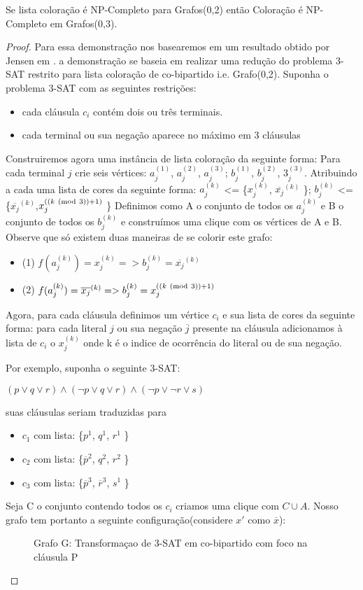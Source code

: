 \begin{corolario}
	Se lista coloração é NP-Completo para Grafos(0,2) então Coloração é NP-Completo em Grafos(0,3).
	\begin{proof}
		Para essa demonstração nos basearemos em um resultado obtido por Jensen em \cite{jansen1999}. a demonstração se baseia em realizar uma redução do problema 3-SAT restrito para lista coloração de co-bipartido i.e. Grafo(0,2).
		Suponha o problema 3-SAT com as seguintes restrições:
		\begin{itemize}
			\item cada cláusula $c_i$ contém dois ou três terminais.
			\item cada terminal ou sua negação aparece no máximo em 3 cláusulas
		\end{itemize}
		Construiremos agora uma instância de lista coloração da seguinte forma:\newline
		Para cada terminal $j$ crie seis vértices:
		$a_j^{(1)}$, $a_j^{(2)}$, $a_j^{(3)}$;
		$b_j^{(1)}$, $b_j^{(2)}$, $3_j^{(3)}$. Atribuindo a cada uma lista de cores da seguinte forma:\newline
		$a_j^{(k)}$ <= \{$x_j^{(k)}$, $\overline{x_j}^{(k)}$ \}; $b_j^{(k)}$ <= \{$\overline{x_j}^{(k)}$,$x_j^{((k \ (\mathrm{mod}\ 3)) + 1 )}$ \}\newline
		Definimos como A o conjunto de todos os $a_j^{(k)}$ e B o conjunto de todos os $b_j^{(k)}$ e construímos uma clique com os vértices de A e B. Observe que só existem duas maneiras de se colorir este grafo:
		\begin{itemize}
			\item (1)  $f(a_j^{(k)}) = x_j^{(k)} => b_j^{(k)} = \overline{x_j}^{(k)}$
			\item (2)  $f(a_j^{(k)}) = \overline{x_j}^{(k)} => b_j^{(k)} = x_j^{((k \ (\mathrm{mod}\ 3)) + 1 )}$
		\end{itemize}
		Agora, para cada cláusula definimos um vértice $c_i$ e sua lista de cores da seguinte forma: para cada literal $j$ ou sua negação $\overline{j}$ presente na cláusula adicionamos à lista de $c_i$ o $x_j^{(k)}$ onde k é o indice de ocorrência do literal ou de sua negação.
		
		Por exemplo, suponha o seguinte 3-SAT:
		
		$(p \lor q \lor r) \land (\neg{p} \lor q \lor r) \land (\neg{p} \lor \neg{r} \lor s)$
		
		suas cláusulas seriam traduzidas para
		\begin{itemize}
			\item $c_1$ com lista: \{$p^1$, $q^1$, $r^1$ \}
			\item $c_2$ com lista: \{$\overline{p}^2$, $q^2$, $r^2$ \}
			\item $c_3$ com lista: \{$\overline{p}^3$, $\overline{r}^3$, $s^1$ \}
		\end{itemize}
		Seja C o conjunto contendo todos os $c_i$ criamos uma clique com $C \cup A$.
		Nosso grafo tem portanto a seguinte configuração(considere $x'$ como $\overline{x}$):
		\begin{figure}[!ht]
			\centering
			
			\caption{Grafo G: Transformaçao de 3-SAT em co-bipartido com foco na cláusula P }
		\end{figure}
		

\end{proof}
\end{corolario}
